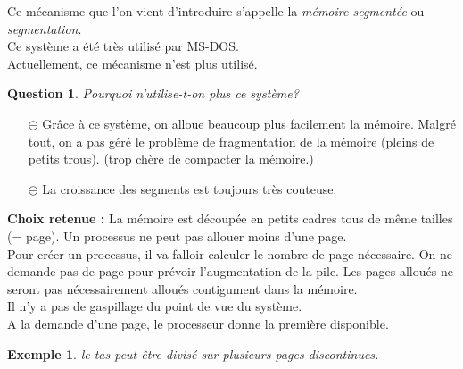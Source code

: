 \documentclass[12pt,a4paper]{report}
\newtheorem*{ex}{Exemple}
\newtheorem*{q}{Question}
\begin{document}
Ce mécanisme que l'on vient d'introduire s'appelle la \emph{mémoire segmentée} ou \emph{segmentation}.\\
Ce système a été très utilisé par MS-DOS.\\

Actuellement, ce mécanisme n'est plus utilisé.\\
\begin{q} Pourquoi n'utilise-t-on plus ce système?\end{q}
\begin{itemize}
\item[$\ominus$] Grâce à ce système, on alloue beaucoup plus facilement la mémoire. Malgré tout, on a pas géré le problème de fragmentation de la mémoire (pleins de petits trous). (trop chère de compacter la mémoire.)
\item[$\ominus$] La croissance des segments est toujours très couteuse.
\end{itemize}

\textbf{Choix retenue :} La mémoire est découpée en petits cadres tous de même tailles (= page). Un processus ne peut pas allouer moins d'une page.\\
Pour créer un processus, il va falloir calculer le nombre de page nécessaire. On ne demande pas de page pour prévoir l'augmentation de la pile. Les pages alloués ne seront pas nécessairement alloués contigument dans la mémoire.\\
Il n'y a pas de gaspillage du point de vue du système.\\
A la demande d'une page, le processeur donne la première disponible.
\begin{ex} le tas peut être divisé sur plusieurs pages discontinues. \end{ex}
\end{document}

